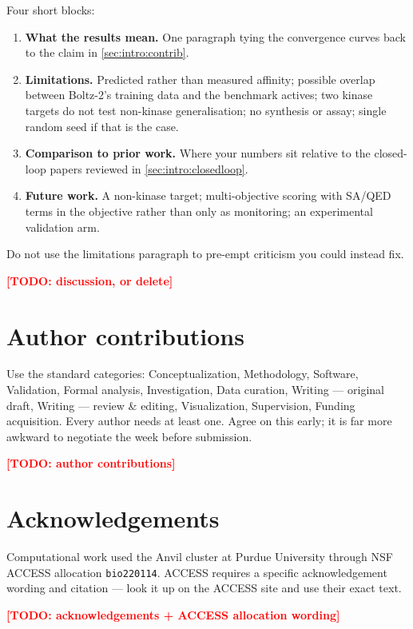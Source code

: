 \documentclass[11pt]{article}
\newcommand{\TODO}[1]{\textcolor{red}{\textbf{[TODO: #1]}}}
\begin{document}
\begin{guide}
Four short blocks:
\begin{enumerate}\itemsep0pt
  \item \textbf{What the results mean.} One paragraph tying the convergence
        curves back to the claim in \cref{sec:intro:contrib}.
  \item \textbf{Limitations.} Predicted rather than measured affinity; possible
        overlap between Boltz-2's training data and the benchmark actives; two
        kinase targets do not test non-kinase generalisation; no synthesis or
        assay; single random seed if that is the case.
  \item \textbf{Comparison to prior work.} Where your numbers sit relative to
        the closed-loop papers reviewed in \cref{sec:intro:closedloop}.
  \item \textbf{Future work.} A non-kinase target; multi-objective scoring with
        SA/QED terms in the objective rather than only as monitoring; an
        experimental validation arm.
\end{enumerate}
Do not use the limitations paragraph to pre-empt criticism you could instead fix.
\end{guide}

\TODO{discussion, or delete}

\section*{Author contributions}
\begin{guide}
Use the standard categories: Conceptualization, Methodology, Software,
Validation, Formal analysis, Investigation, Data curation, Writing --- original
draft, Writing --- review \& editing, Visualization, Supervision, Funding
acquisition. Every author needs at least one. Agree on this early; it is far
more awkward to negotiate the week before submission.
\end{guide}
\TODO{author contributions}

\section*{Acknowledgements}
\begin{guide}
Computational work used the Anvil cluster at Purdue University through NSF
ACCESS allocation \texttt{bio220114}. ACCESS requires a specific
acknowledgement wording and citation --- look it up on the ACCESS site and use
their exact text.
\end{guide}
\TODO{acknowledgements + ACCESS allocation wording}


\end{document}
